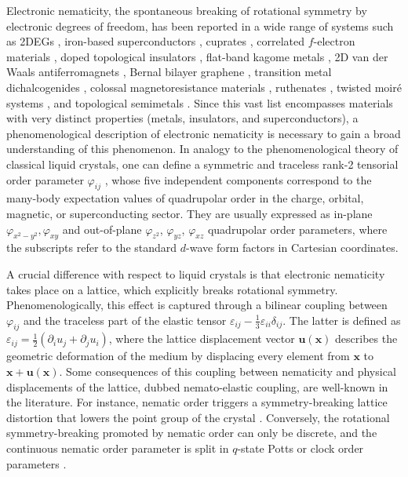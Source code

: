 \documentclass[aps,prb, twocolumn, superscriptaddress, amsmath, amsfonts, amssymb, amsthm]{revtex4-2}
\begin{document}
Electronic nematicity, the spontaneous breaking of rotational symmetry by electronic degrees of freedom, has been reported in a wide range of systems such as 2DEGs \cite{Eisenstein99_nem,Feldman16_nem},
iron-based superconductors \cite{Chu2010_nem,Chuang2010_nem,Fernandes2014},
cuprates \cite{Hinkov08_nem,Davis10_nem}, correlated $f$-electron
materials \cite{Ronning17_nem,Rosenberg2019_nem,Seo2020_nem,Massat2022_nem,Jiang2025},
doped topological insulators \cite{Tamegai2019_nem,Cho2020_nem},
flat-band kagome metals \cite{Drucker2024_nem}, 2D van der Waals
antiferromagnets \cite{RMF08_Potts_nematic_strain,Hwangbo2024_nem,Sun2024_nem,Tan2024_nem},
Bernal bilayer graphene \cite{Geim11_nem}, transition metal dichalcogenides
\cite{Little2020_nem,Hamill2021_nem,Cho2022_nem,Silber2024_nem},
colossal magnetoresistance materials \cite{Beaudin2022_nem}, ruthenates
\cite{Mackenzie07_nem}, twisted moir\'e systems \cite{Jiang2019_nem,Cao2021_nem,RubioVerdu2022_nem,Zhang2022_nem},
and topological semimetals \cite{Siddiquee2022_nem,Venkatesan2024_nem,Hossain2024_nem}. Since this vast list encompasses materials with very distinct properties (metals, insulators, and superconductors), a phenomenological description of electronic nematicity is necessary to gain a broad understanding of this phenomenon. In analogy to the phenomenological theory of classical liquid crystals, one can define a symmetric and traceless rank-2 tensorial order parameter $\varphi_{ij}$ \cite{Oganesyan01}, whose five independent components correspond to the many-body expectation values of quadrupolar order in the charge, orbital, magnetic, or superconducting sector.  They are usually expressed as in-plane $\varphi_{x^2-y^2}, \varphi_{xy}$ and out-of-plane  $\varphi_{z^2}$, $\varphi_{yz}$, $\varphi_{xz}$ quadrupolar order parameters, where the subscripts refer to the standard $d$-wave form factors in Cartesian coordinates.

A crucial difference with respect to liquid crystals is that electronic nematicity takes place on a lattice, which explicitly breaks rotational symmetry. Phenomenologically, this effect is captured through a bilinear coupling between  $\varphi_{ij}$  and the traceless part of the elastic tensor $\varepsilon_{ij}-\frac{1}{3}\varepsilon_{ii} \delta_{ij}$. The latter is defined as $\varepsilon_{ij}=\tfrac{1}{2}(\partial_i u_j + \partial_j u_i)$, where the lattice displacement vector $ \boldsymbol{u}(\boldsymbol{x})$ describes the geometric deformation of the medium by displacing every element from $\boldsymbol{x}$ to $\boldsymbol{x} + \boldsymbol{u}(\boldsymbol{x})$. Some consequences of this coupling between nematicity and physical displacements of the lattice, dubbed nemato-elastic coupling, are well-known in the literature.  For instance,  nematic order triggers a symmetry-breaking lattice distortion that lowers the point group of the crystal \cite{Fradkin_review,Fernandes2014}. Conversely, the rotational symmetry-breaking promoted by nematic order can only be discrete, and the continuous nematic order parameter is split in $q$-state Potts or clock order parameters \cite{RMF14_classification_nematics}.
\end{document}
